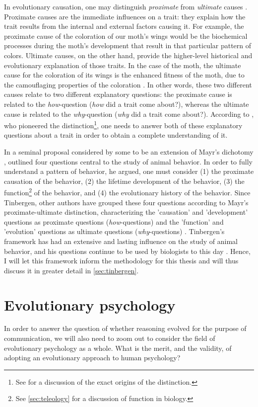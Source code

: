 In evolutionary causation, one may distinguish \emph{proximate} from \emph{ultimate} causes \citep{Mayr61}.
Proximate causes are the immediate influences on a trait: they explain how the trait results from the internal and external factors causing it. For example, the proximate cause of the coloration of our moth's wings would be the biochemical processes during the moth's development that result in that particular pattern of colors.
Ultimate causes, on the other hand, provide the higher-level historical and evolutionary explanation of those traits. In the case of the moth, the ultimate cause for the coloration of its wings is the enhanced fitness of the moth, due to the camouflaging properties of the coloration \citep{Lipton09}. In other words, these two different causes relate to two different explanatory questions: the proximate cause is related to the \emph{how}-question (\emph{how} did a trait come about?), whereas the ultimate cause is related to the \emph{why}-question (\emph{why} did a trait come about?). According to \citet{Mayr61}, who pioneered the distinction\footnote{See \citep{Laland13} for a discussion of the exact origins of the distinction.}, one needs to answer both of these explanatory questions about a trait in order to obtain a complete understanding of it.

In a seminal proposal considered by some to be an extension of Mayr's dichotomy \citep{Laland13}, \citet{Tinbergen63} outlined four questions central to the study of animal behavior. In order to fully understand a pattern of behavior, he argued, one must consider (1) the proximate causation of the behavior, (2) the lifetime development of the behavior, (3) the function\footnote{See \cref{sec:teleology} for a discussion of function in biology.} of the behavior, and (4) the evolutionary history of the behavior.
Since Tinbergen, other authors have grouped these four questions according to Mayr's proximate-ultimate distinction, characterizing the 'causation' and 'development' questions as proximate questions (\emph{how}-questions) and the 'function' and 'evolution' questions as ultimate questions (\emph{why}-questions) \citep{BatesonLaland13, Laland13}.
Tinbergen's framework has had an extensive and lasting influence on the study of animal behavior, and his questions continue to be used by biologists to this day \citep{BatesonLaland13}. Hence, I will let this framework inform the methodology for this thesis and will thus discuss it in greater detail in \cref{sec:tinbergen}.

\section{Evolutionary psychology}
\label{sec:evol-psych}
In order to answer the question of whether reasoning evolved for the purpose of communication, we will also need to zoom out to consider the field of evolutionary psychology as a whole.
What is the merit, and the validity, of adopting an evolutionary approach to human psychology?

